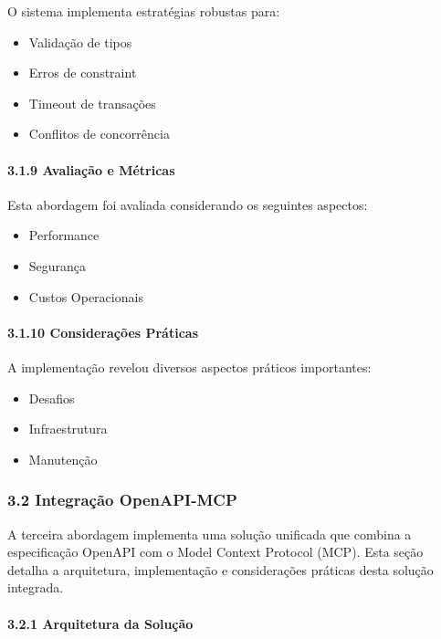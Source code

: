 \documentclass[
]{article}
\providecommand{\tightlist}{%
  \setlength{\itemsep}{0pt}\setlength{\parskip}{0pt}}
\begin{document}
O sistema implementa estratégias robustas para:

\begin{itemize}
\tightlist
\item
  Validação de tipos
\item
  Erros de constraint
\item
  Timeout de transações
\item
  Conflitos de concorrência
\end{itemize}

\paragraph{3.1.9 Avaliação e
Métricas}\label{avaliauxe7uxe3o-e-muxe9tricas}

Esta abordagem foi avaliada considerando os seguintes aspectos:

\begin{itemize}
\tightlist
\item
  Performance
\item
  Segurança
\item
  Custos Operacionais
\end{itemize}

\paragraph{3.1.10 Considerações
Práticas}\label{considerauxe7uxf5es-pruxe1ticas}

A implementação revelou diversos aspectos práticos importantes:

\begin{itemize}
\tightlist
\item
  Desafios
\item
  Infraestrutura
\item
  Manutenção
\end{itemize}

\subsubsection{3.2 Integração
OpenAPI-MCP}\label{integrauxe7uxe3o-openapi-mcp}

A terceira abordagem implementa uma solução unificada que combina a
especificação OpenAPI com o Model Context Protocol (MCP). Esta seção
detalha a arquitetura, implementação e considerações práticas desta
solução integrada.

\paragraph{3.2.1 Arquitetura da
Solução}\label{arquitetura-da-soluuxe7uxe3o-1}
\end{document}
